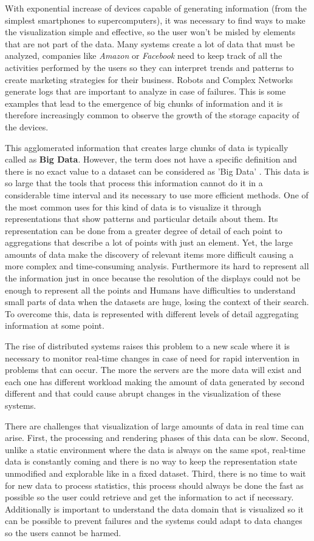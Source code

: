 \documentclass[letterpaper, 10 pt, conference]{ieeeconf}  %
\begin{document}
With exponential increase of devices capable of generating information (from the simplest smartphones to supercomputers), it was necessary to find ways to make the visualization simple and effective, so the user won't be misled by elements that are not part of the data. Many systems create a lot of data that must be analyzed, companies like \textit{Amazon} or \textit{Facebook} need to keep track of all the activities performed by the users so they can interpret trends and patterns to create marketing strategies for their business. Robots and Complex Networks generate logs that are important to analyze in case of failures. This is some examples that lead to the emergence of big chunks of information and it is therefore increasingly common to observe the growth of the storage capacity of the devices.

This agglomerated information that creates large chunks of data is typically called as \textbf{Big Data}. However, the term does not have a specific definition and there is no exact value to a dataset can be considered as 'Big Data' \cite{WardB13a}. This data is so large that the tools that process this information cannot do it in a considerable time interval and its necessary to use more efficient methods. One of the most common uses for this kind of data is to visualize it through representations that show patterns and particular details about them. Its representation can be done from a greater degree of detail of each point to aggregations that describe a lot of points with just an element. Yet, the large amounts of data make the discovery of relevant items more difficult causing a more complex and time-consuming analysis. Furthermore its hard to represent all the information just in once because the resolution of the displays could not be enough to represent all the points and Humans have difficulties to understand small parts of data when the datasets are huge, losing the context of their search. To overcome this, data is represented with different levels of detail aggregating information at some point. 

The rise of distributed systems raises this problem to a new scale where it is necessary to monitor real-time changes in case of need for rapid intervention in problems that can occur. The more the servers are the more data will exist and each one has different workload making the amount of data generated by second different and that could cause abrupt changes in the visualization of these systems.

There are challenges that visualization of large amounts of data in real time can arise. First, the processing and rendering phases of this data can be slow. Second, unlike a static environment where the data is always on the same spot, real-time data is constantly coming and there is no way to keep the representation state unmodified and explorable like in a fixed dataset. Third, there is no time to wait for new data to process statistics, this process should always be done the fast as possible so the user could retrieve and get the information to act if necessary. Additionally is important to understand the data domain that is visualized so it can be possible to prevent failures and the systems could adapt to data changes so the users cannot be harmed. 
\end{document}
